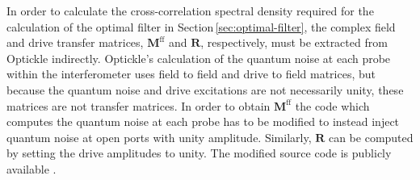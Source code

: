 In order to calculate the cross-correlation spectral density required for the calculation of the optimal filter in Section\,\ref{sec:optimal-filter}, the complex field and drive transfer matrices, $\mathbf{M}^{\textrm{ff}}$ and $\mathbf{R}$, respectively, must be extracted from Optickle indirectly. Optickle's calculation of the quantum noise at each probe within the interferometer uses field to field and drive to field matrices, but because the quantum noise and drive excitations are not necessarily unity, these matrices are not transfer matrices. In order to obtain $\mathbf{M}^{\textrm{ff}}$ the code which computes the quantum noise at each probe has to be modified to instead inject quantum noise at open ports with unity amplitude. Similarly, $\mathbf{R}$ can be computed by setting the drive amplitudes to unity. The modified source code is publicly available \cite{controlspaperdata}.